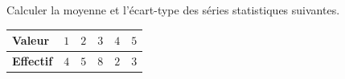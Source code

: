 \begin{exo}
	Calculer la moyenne et l'écart-type des séries statistiques suivantes.

	\begin{center}
		\def\arraystretch{1.4}
		\begin{tabular}{|l|*{5}{c|}} \hline
			\textbf{Valeur}   & $1$ & $2$ & $3$ & $4$ & $5$ \\ \hline
			\textbf{Effectif} & $4$ & $5$ & $8$ & $2$ & $3$ \\ \hline
		\end{tabular}
	\end{center}
\end{exo}

